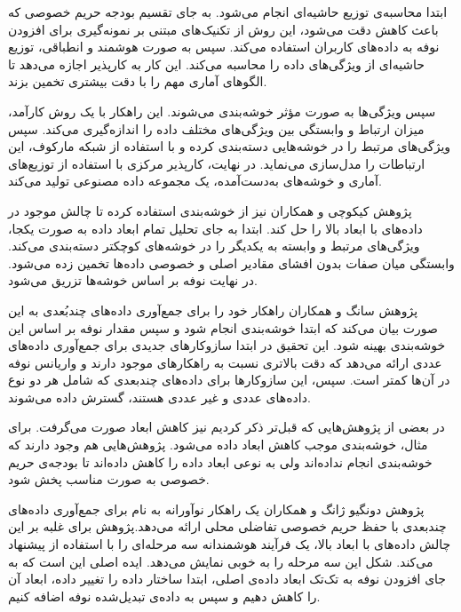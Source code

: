 ابتدا محاسبه‌ی توزیع حاشیه‌ای انجام می‌شود. به جای تقسیم بودجه حریم خصوصی که باعث کاهش دقت می‌شود، این روش از تکنیک‌های مبتنی بر نمونه‌گیری برای افزودن نوفه به داده‌های کاربران استفاده می‌کند. سپس به صورت هوشمند و انطباقی، توزیع حاشیه‌ای از ویژگی‌های داده را محاسبه می‌کند. این کار به کارپذیر اجازه می‌دهد تا الگوهای آماری مهم را با دقت بیشتری تخمین بزند.

سپس ویژگی‌ها به صورت مؤثر خوشه‌بندی می‌شوند. این راهکار با یک روش کارآمد، میزان ارتباط و وابستگی بین ویژگی‌های مختلف داده را اندازه‌گیری می‌کند. سپس ویژگی‌های مرتبط را در خوشه‌هایی دسته‌بندی کرده و با استفاده از شبکه مارکوف، این ارتباطات را مدل‌سازی می‌نماید. در نهایت، کارپذیر مرکزی با استفاده از توزیع‌های آماری و خوشه‌های به‌دست‌آمده، یک مجموعه داده مصنوعی تولید می‌کند. 


پژوهش کیکوچی و همکاران  نیز از خوشه‌بندی استفاده کرده تا چالش موجود در داده‌های با ابعاد بالا را حل کند. ابتدا به جای تحلیل تمام ابعاد داده به صورت یکجا، ویژگی‌های مرتبط و وابسته به یکدیگر را در خوشه‌های کوچکتر دسته‌بندی می‌کند. وابستگی میان صفات بدون افشای مقادیر اصلی و خصوصی داده‌ها تخمین زده می‌شود. در نهایت نوفه بر اساس خوشه‌ها تزریق می‌شود.


پژوهش سانگ و همکاران  راهکار خود را برای جمع‌آوری داده‌های چند‌بُعدی به این صورت بیان می‌کند که ابتدا خوشه‌بندی انجام شود و سپس مقدار نوفه بر اساس این خوشه‌بندی بهینه شود. این تحقیق در ابتدا سازوکار‌های جدیدی برای جمع‌آوری داده‌های عددی ارائه می‌دهد که دقت بالاتری نسبت به راهکارهای موجود دارند و واریانس نوفه در آن‌ها کمتر است. سپس، این سازوکارها برای داده‌های چندبعدی که شامل هر دو نوع داده‌های عددی و غیر عددی هستند، گسترش داده می‌شوند.



در بعضی از پژوهش‌هایی که قبل‌تر ذکر کردیم نیز کاهش ابعاد صورت می‌گرفت. برای مثال، خوشه‌بندی موجب کاهش ابعاد داده می‌شود. پژوهش‌هایی هم وجود دارند که خوشه‌بندی انجام نداده‌اند ولی به نوعی ابعاد داده را کاهش داده‌اند تا بودجه‌ی حریم خصوصی به صورت مناسب پخش شود.


پژوهش دونگیو ژانگ و همکاران  یک راهکار نوآورانه به نام  برای جمع‌آوری داده‌های چندبعدی با حفظ حریم خصوصی تفاضلی محلی ارائه می‌دهد.پژوهش برای غلبه بر این چالش داده‌های با ابعاد بالا، یک فرآیند هوشمندانه سه مرحله‌ای را با استفاده از  پیشنهاد می‌کند. شکل  این سه مرحله را به خوبی نمایش می‌دهد. ایده اصلی این است که به جای افزودن نوفه به تک‌تک ابعاد داده‌ی اصلی، ابتدا ساختار داده را تغییر داده، ابعاد آن را کاهش دهیم و سپس به داده‌ی تبدیل‌شده نوفه اضافه کنیم.

